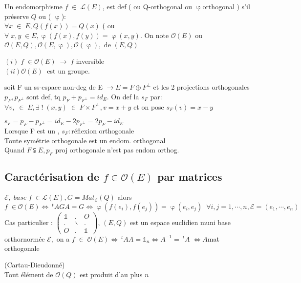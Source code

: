\documentclass[11pt]{article} %
\begin{document}
 Un endomorphisme $f \; \in \; \mathcal{L}(E)$, est def  ( ou Q-orthogonal ou $\upvarphi$orthogonal ) s'il préserve $Q$ ou ( $\upvarphi$): \\  $ \forall x \; \in \; E, Q(f(x))=Q(x)$ ( ou $ \forall \; x,y \; \in E, \upvarphi(f(x),f(y))= \upvarphi(x,y)$. On note $ \mathcal{O}(E)$ ou $ \mathcal{O}(E,Q),\mathcal{O}(E, \upvarphi), \mathcal{O}(\upvarphi), $  de $ (E,Q)$

\proposition $(i) \; f \; \in \mathcal{O}(E) \; \longrightarrow \; f$ inversible \\ $ (ii) \mathcal{O}(E) \;$ est un groupe.

 soit F un ss-espace non-deg de E $\longrightarrow E = F \oplus F^{\bot} $ et les 2 projections orthogonales $ p_F, p_{F^{\bot}}$ sont def, tq $ p_F + p_{F^{\bot}} =id_E$. On def la  $s_F$ par: $\forall v, \; \in \; E, \exists \; ! \; (x,y) \; \in \; F \times F^{\bot}, v=x+y $ et on pose $s_F(v)=x-y$

\commentaire $s_F = p_F - p_{F^{\bot}}= id_E - 2 p_{F^{\bot}} = 2 p_F - id_E$ \\ Lorsque F est un , $s_F:$réflexion orthogonale \\ Toute symétrie orthogonale est un endom. orthogonal \\ Quand $F \subsetneqq E, p_F$ proj orthogonale n'est pas endom orthog.

\subsection{Caractérisation de $f \in \mathcal{O}(E)$ par matrices}

\commentaire $\mathcal{E}, \; base \; f \; \in \mathcal{L}(E), G = Mat_{\mathcal{E}}(Q) $ alors $f \; \in \mathcal{O}(E) \iff ~^tAGA=G \iff \upvarphi(f(e_i),f(e_j)) = \upvarphi(e_i,e_j) \; \; \forall i,j=1, \cdots, n, \mathcal{E}=(e_1, \cdots, e_n)$ \\ Cas particulier : $\begin{pmatrix}
\mathds{1} & . & O\\
. & \ddots & .\\
O & . & \mathds{1}
\end{pmatrix}$, $(E,Q)$ est un espace euclidien muni base orthornormée $\mathcal{E}, $ on a $f \; \in \; \mathcal{O}(E) \iff ~^tAA= \mathds{1}_n \iff A^{-1}=~^tA \; \iff A $mat orthogonale

\theoreme (Cartau-Dieudonné) \\ Tout élément de $\mathcal{O}(Q)$ est produit d'au plus $n$ 
\end{document}
